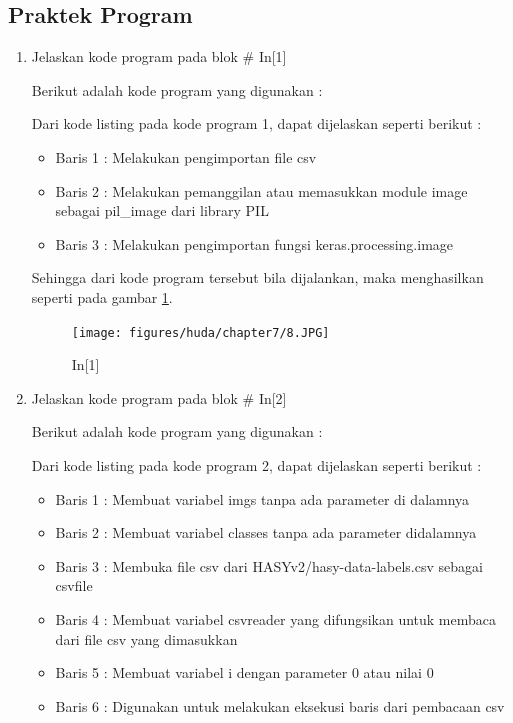 \subsection{Praktek Program}
\begin{enumerate}
\item Jelaskan kode program pada blok \# In[1]
\par Berikut adalah kode program yang digunakan :

\par Dari kode listing pada kode program 1, dapat dijelaskan seperti berikut :
\begin{itemize}
\item Baris 1	: Melakukan pengimportan file csv
\item Baris 2	: Melakukan pemanggilan atau memasukkan module image sebagai pil\_image dari library PIL
\item Baris 3	: Melakukan pengimportan fungsi keras.processing.image 
\end{itemize}
\par Sehingga dari kode program tersebut bila dijalankan, maka menghasilkan seperti pada gambar \ref{c7_8}.
\begin{figure}[!htbp]
	\centerline{\texttt{[image: figures/huda/chapter7/8.JPG]}}
	\caption{In[1]}
	\label{c7_8}
\end{figure}
\item Jelaskan kode program pada blok \# In[2]
\par Berikut adalah kode program yang digunakan :

\par Dari kode listing pada kode program 2, dapat dijelaskan seperti berikut :
\begin{itemize}
\item Baris 1	: Membuat variabel imgs tanpa ada parameter di dalamnya
\item Baris 2	: Membuat variabel classes tanpa ada parameter didalamnya
\item Baris 3	: Membuka file csv dari HASYv2/hasy-data-labels.csv sebagai csvfile
\item Baris 4	: Membuat variabel csvreader yang difungsikan untuk membaca dari file csv yang dimasukkan
\item Baris 5	: Membuat variabel i dengan parameter 0 atau nilai 0
\item Baris 6	: Digunakan untuk melakukan eksekusi baris dari pembacaan csv 

\end{itemize}
\end{enumerate}
